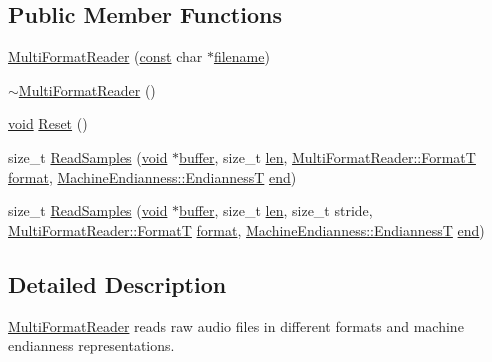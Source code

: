 \subsection*{Public Member Functions}
\begin{DoxyCompactItemize}
\item 
\hyperlink{class_multi_format_reader_a3f6dfbd78d9caf037caac6385cb6c3fa}{Multi\+Format\+Reader} (\hyperlink{getopt1_8c_a2c212835823e3c54a8ab6d95c652660e}{const} char $\ast$\hyperlink{test__portburn_8cpp_a7efa5e9c7494c7d4586359300221aa5d}{filename})
\item 
\hyperlink{class_multi_format_reader_a783c1c776284c60e07bb945217ff7f7e}{$\sim$\+Multi\+Format\+Reader} ()
\item 
\hyperlink{sound_8c_ae35f5844602719cf66324f4de2a658b3}{void} \hyperlink{class_multi_format_reader_a6da7661340b10a3c717c496e67909039}{Reset} ()
\item 
size\+\_\+t \hyperlink{class_multi_format_reader_a5dc5fa8632e6ae51a095da89c32266d6}{Read\+Samples} (\hyperlink{sound_8c_ae35f5844602719cf66324f4de2a658b3}{void} $\ast$\hyperlink{structbuffer}{buffer}, size\+\_\+t \hyperlink{lib_2expat_8h_af86d325fecfc8f47b61fbf5a5146f582}{len}, \hyperlink{class_multi_format_reader_a6669d0a4e5bb7b72224b6769fea22566}{Multi\+Format\+Reader\+::\+FormatT} \hyperlink{_export_p_c_m_8cpp_a317afff57d87a89158c2b038d37b2b08}{format}, \hyperlink{class_machine_endianness_a1d179c9c1da7949f5670f5654e0be09b}{Machine\+Endianness\+::\+EndiannessT} \hyperlink{convtest_8m_afb358f48b1646c750fb9da6c6585be2b}{end})
\item 
size\+\_\+t \hyperlink{class_multi_format_reader_a51afae8a687078e7f6fa60889ab30e85}{Read\+Samples} (\hyperlink{sound_8c_ae35f5844602719cf66324f4de2a658b3}{void} $\ast$\hyperlink{structbuffer}{buffer}, size\+\_\+t \hyperlink{lib_2expat_8h_af86d325fecfc8f47b61fbf5a5146f582}{len}, size\+\_\+t stride, \hyperlink{class_multi_format_reader_a6669d0a4e5bb7b72224b6769fea22566}{Multi\+Format\+Reader\+::\+FormatT} \hyperlink{_export_p_c_m_8cpp_a317afff57d87a89158c2b038d37b2b08}{format}, \hyperlink{class_machine_endianness_a1d179c9c1da7949f5670f5654e0be09b}{Machine\+Endianness\+::\+EndiannessT} \hyperlink{convtest_8m_afb358f48b1646c750fb9da6c6585be2b}{end})
\end{DoxyCompactItemize}


\subsection{Detailed Description}
\hyperlink{class_multi_format_reader}{Multi\+Format\+Reader} reads raw audio files in different formats and machine endianness representations. 

